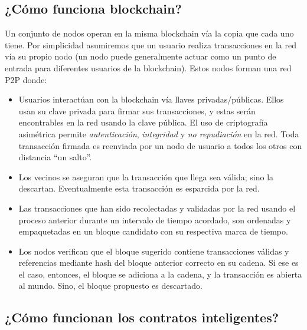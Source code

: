 \subsection{¿Cómo funciona blockchain?}\label{secc:BC}
Un conjunto de nodos operan en la misma blockchain vía la copia que cada uno tiene. Por simplicidad asumiremos que un usuario realiza transacciones en la red vía su propio nodo (un nodo puede generalmente actuar como un punto de entrada para diferentes usuarios de la blockchain). Estos nodos forman una red P2P donde:


\begin{itemize}
    \item Usuarios interactúan con la blockchain vía llaves privadas/públicas. Ellos usan su clave privada para firmar sus transacciones, y estas serán encontrables en la red usando la clave pública. El uso de criptografía asimétrica permite \textit{autenticación}, \textit{integridad} y \textit{no repudiación} en la red. Toda transacción firmada es reenviada por un nodo de usuario a todos los otros con distancia ``un salto''. 
    \item Los vecinos se aseguran que la transacción que llega sea válida; sino la descartan. Eventualmente esta transacción es esparcida por la red. 
     \item Las transacciones que han sido recolectadas y validadas por la red usando el proceso anterior durante un intervalo de tiempo acordado, son ordenadas y empaquetadas en un bloque candidato con su respectiva marca de tiempo. 
    \item Los nodos verifican que el bloque sugerido contiene transacciones válidas y referencias mediante hash del bloque anterior correcto en su cadena. Si ese es el caso, entonces, el bloque se adiciona a la cadena, y la transacción es abierta al mundo. Sino, el bloque propuesto es descartado. 
\end{itemize}



\subsection{¿Cómo funcionan los contratos inteligentes?}\label{secc:CI}

